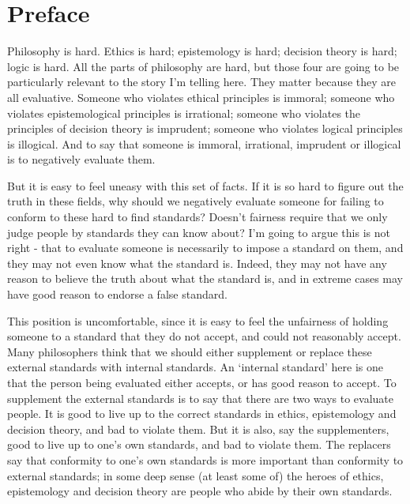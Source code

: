 

\chapter*{Preface} 

Philosophy is hard. Ethics is hard; epistemology is hard; decision theory is hard; logic is hard. All the parts of philosophy are hard, but those four are going to be particularly relevant to the story I'm telling here. They matter because they are all evaluative. Someone who violates ethical principles is immoral; someone who violates epistemological principles is irrational; someone who violates the principles of decision theory is imprudent; someone who violates logical principles is illogical. And to say that someone is immoral, irrational, imprudent or illogical is to negatively evaluate them.

But it is easy to feel uneasy with this set of facts. If it is so hard to figure out the truth in these fields, why should we negatively evaluate someone for failing to conform to these hard to find standards? Doesn't fairness require that we only judge people by standards they can know about? I'm going to argue this is not right - that to evaluate someone is necessarily to impose a standard on them, and they may not even know what the standard is. Indeed, they may not have any reason to believe the truth about what the standard is, and in extreme cases may have good reason to endorse a false standard.

This position is uncomfortable, since it is easy to feel the unfairness of holding someone to a standard that they do not accept, and could not reasonably accept. Many philosophers think that we should either supplement or replace these external standards with internal standards. An `internal standard' here is one that the person being evaluated either accepts, or has good reason to accept. To supplement the external standards is to say that there are two ways to evaluate people. It is good to live up to the correct standards in ethics, epistemology and decision theory, and bad to violate them. But it is also, say the supplementers, good to live up to one's own standards, and bad to violate them. The replacers say that conformity to one's own standards is more important than conformity to external standards; in some deep sense (at least some of) the heroes of ethics, epistemology and decision theory are people who abide by their own standards.

